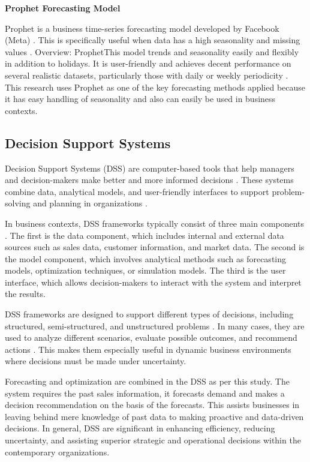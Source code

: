 \textbf{Prophet Forecasting Model}

Prophet is a business time-series forecasting model developed by Facebook (Meta) \citep{sivaramakrishnan2022forecasting}. This is specifically useful when data has a high seasonality and missing values \citep{anand2024comparative}. Overview: ProphetThis model trends and seasonality easily and flexibly in addition to holidays. It is user-friendly and achieves decent performance on several realistic datasets, particularly those with daily or weekly periodicity \citep{najem2026hybrid}. This research uses Prophet as one of the key forecasting methods applied because it has easy handling of seasonality and also can easily be used in business contexts.


\subsection{Decision Support Systems}

Decision Support Systems (DSS) are computer-based tools that help managers and decision-makers make better and more informed decisions \citep{fernando2022decision}. These systems combine data, analytical models, and user-friendly interfaces to support problem-solving and planning in organizations \citep{triantafyllou2024decision}. 

In business contexts, DSS frameworks typically consist of three main components \citep{bernardi2024conversing}. The first is the data component, which includes internal and external data sources such as sales data, customer information, and market data. The second is the model component, which involves analytical methods such as forecasting models, optimization techniques, or simulation models. The third is the user interface, which allows decision-makers to interact with the system and interpret the results.

DSS frameworks are designed to support different types of decisions, including structured, semi-structured, and unstructured problems \citep{alojail2023informed}. In many cases, they are used to analyze different scenarios, evaluate possible outcomes, and recommend actions \citep{ghiani2024integrating}. This makes them especially useful in dynamic business environments where decisions must be made under uncertainty.

Forecasting and optimization are combined in the DSS as per this study. The system requires the past sales information, it forecasts demand and makes a decision recommendation on the basis of the forecasts. This assists businesses in leaving behind mere knowledge of past data to making proactive and data-driven decisions. In general, DSS are significant in enhancing efficiency, reducing uncertainty, and assisting superior strategic and operational decisions within the contemporary organizations.


